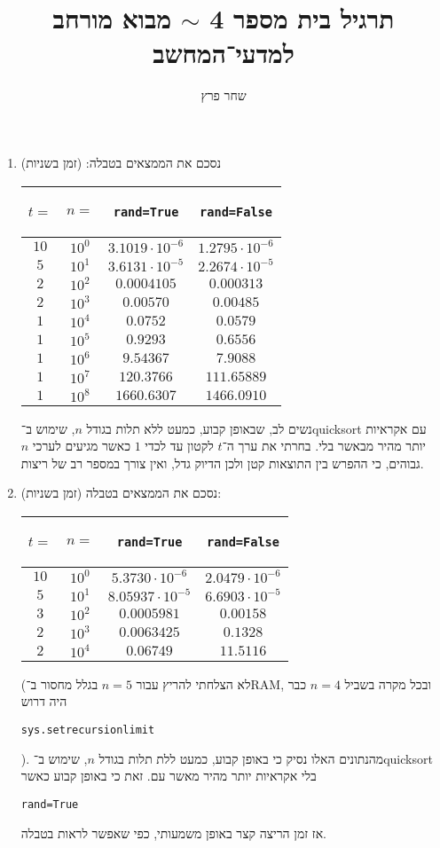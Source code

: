 \documentclass[]{article}
\author{שחר פרץ}
\title{תרגיל בית מספר 4 $\sim$ מבוא מורחב למדעי־המחשב}
\newcommand\en[1] {\begin{otherlanguage}{english}#1\end{otherlanguage}}
\newcommand\sen   {\begin{otherlanguage}{english}}
\newcommand\she   {\end{otherlanguage}}
\newcommand\ttt[1]{\en{\footnotesize\texttt{#1}\normalsize}}
\begin{document}
	\maketitle
	\section{} %
	\begin{enumerate}[A']
		\item נסכם את הממצאים בטבלה: (זמן בשניות)
		\begin{center}
			\sen\begin{tabular}{|c|c|c|c|}
				\hline $t=$ & $n=$ & \ttt{rand=True} & \ttt{rand=False} \\
				\hline $10$ & $10^0$ & $3.1019 \cdot 10^{-6}$ & $1.2795\cdot 10^{-6}$ \\
				\hline $5$ & $10^1$ & $3.6131\cdot10^{-5}$& $2.2674\cdot10^{-5}$ \\
				\hline $2$ & $10^2$ & $0.0004105$ & $0.000313$ \\
				\hline $2$ & $10^3$ & $0.00570$ & $0.00485$ \\
				\hline $1$ & $10^4$ & $0.0752$ & $0.0579$ \\
				\hline $1$ & $10^5$ & $0.9293$ & $0.6556$ \\
				\hline $1$ & $10^6$ & $9.54367$ & $7.9088$ \\
				\hline $1$ & $10^7$ & $120.3766$ & $111.65889$ \\
				\hline $1$ & $10^8$ & $1660.6307$ & $1466.0910$ \\
				\hline
			\end{tabular}
			\she
		\end{center}
		נשים לב, שבאופן קבוע, כמעט ללא תלות בגודל $n$, שימוש ב־quicksort עם אקראיות יותר מהיר מבאשר בלי. בחרתי את ערך ה־$t$ לקטון עד לכדי $1$ כאשר מגיעים לערכי $n$ גבוהים, כי ההפרש בין התוצאות קטן ולכן הדיוק גדל, ואין צורך במספר רב של ריצות. 
		\item נסכם את הממצאים בטבלה (זמן בשניות): 
		\begin{center}
			\sen\begin{tabular}{|c|c|c|c|}
				\hline $t=$ & $n=$ & \ttt{rand=True} & \ttt{rand=False} \\
				\hline $10$ & $10^0$ & $5.3730 \cdot 10^{-6}$ & $2.0479 \cdot 10^{-6}$ \\ 
				\hline $5$ & $10^1$ & $8.05937 \cdot 10^{-5}$ & $6.6903 \cdot 10^{-5}$ \\ 
				\hline $3$ & $10^2$ & $0.0005981$ & $0.00158$ \\ 
				\hline $2$ & $10^3$ & $0.0063425$ & $0.1328$ \\ 
				\hline $2$ & $10^4$ & $0.06749$ & $11.5116$ \\ 
				\hline
			\end{tabular}\she
		\end{center} 
		(לא הצלחתי להריץ עבור $n = 5$ בגלל מחסור ב־RAM, ובכל מקרה בשביל $n = 4$ כבר היה דרוש \ttt{sys.setrecursionlimit}). מהנתונים האלו נסיק כי באופן קבוע, כמעט ללת תלות בגודל $n$, שימוש ב־quicksort בלי אקראיות יותר מהיר מאשר עם. זאת כי באופן קבוע כאשר \ttt{rand=True} אז זמן הריצה קצר באופן משמעותי, כפי שאפשר לראות בטבלה. 
	\end{enumerate}
	
\end{document}
